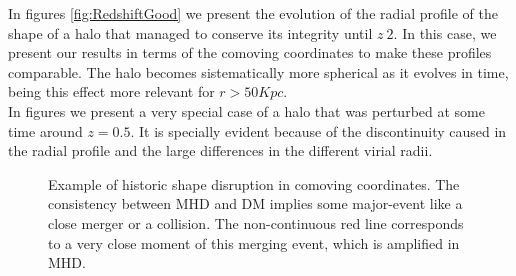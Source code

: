 In figures \ref{fig:RedshiftGood} we present the evolution of the radial profile of the shape of a halo that managed to conserve its integrity until $z~2$. In this case, we present our results in terms of the comoving coordinates to make these profiles comparable. The halo becomes sistematically more spherical as it evolves in time, being this effect more relevant for $r>50Kpc$.\\

In figures \label{fig:RedshiftDMbad} we present a very special case of a halo that was perturbed at some time around $z=0.5$. It is specially evident because of the discontinuity caused in the radial profile and the large differences in the different virial radii. \\  


\begin{figure}[!ht]
  \centering
  \hfill
  \caption{Example of historic shape disruption in comoving coordinates. The consistency between MHD and DM implies some major-event like a close merger or a collision. The non-continuous red line corresponds to a very close moment of this merging event, which is amplified in MHD.}
  \label{fig:RedshiftBad}
\end{figure}

